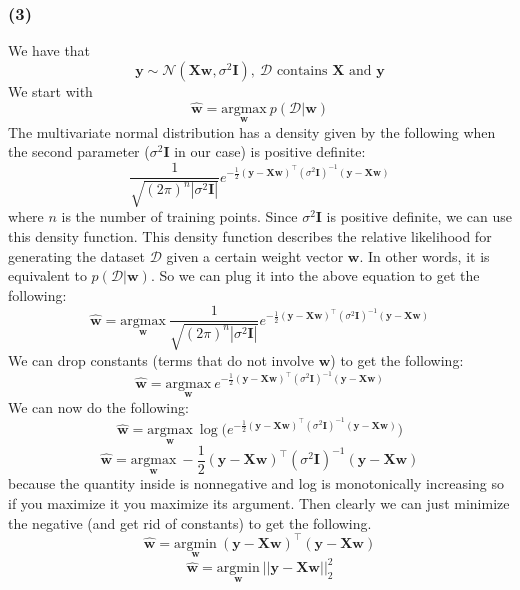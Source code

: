 \documentclass{article}
\newcommand*{\wb}{\ensuremath{\mathbf{w}}}
\newcommand*{\yb}{\ensuremath{\mathbf{y}}}
\newcommand*{\Xb}{\ensuremath{\mathbf{X}}}
\newcommand*{\Ib}{\ensuremath{\mathbf{I}}}
\begin{document}
\subsubsection*{(3)}
We have that
\[ \yb \sim \mathcal{N}(\Xb \wb, \sigma^2 \Ib), \> \mathcal{D} \text{ contains }
    \Xb \text{ and } \yb \]
We start with
\[ \hat{\wb} = \underset{\wb}{\text{argmax}} \> p(\mathcal{D}|\wb) \]
The multivariate normal distribution has a density given by
the following when the second parameter ($\sigma^2 \Ib$ in our case) is positive
definite:
\[ \frac{1}{\sqrt{(2 \pi)^n |\sigma^2 \Ib|}}
    e^{-\frac{1}{2}(\yb - \Xb \wb)^{\intercal} (\sigma^2 \Ib)^{-1}(\yb - \Xb \wb)} \]
where $n$ is the number of training points.
Since $\sigma^2 \Ib$ is positive definite, we can use this density function.
This density function describes the relative likelihood for generating the dataset
$\mathcal{D}$ given a certain weight vector $\wb$. In other words, it is equivalent
to $p(\mathcal{D}|\wb)$. So we can plug it into the above equation to get the
following:
\[ \hat{\wb} = \underset{\wb}{\text{argmax}} \>
    \frac{1}{\sqrt{(2 \pi)^n |\sigma^2 \Ib|}}
    e^{-\frac{1}{2}(\yb - \Xb \wb)^{\intercal} (\sigma^2 \Ib)^{-1}(\yb - \Xb \wb)} \]
We can drop constants (terms that do not involve $\wb$) to get the following:
\[ \hat{\wb} = \underset{\wb}{\text{argmax}} \>
    e^{-\frac{1}{2}(\yb - \Xb \wb)^{\intercal} (\sigma^2 \Ib)^{-1}(\yb - \Xb \wb)} \]
We can now do the following:
\[ \hat{\wb} = \underset{\wb}{\text{argmax}} \>
    \log \Big( e^{-\frac{1}{2}(\yb - \Xb \wb)^{\intercal}
    (\sigma^2 \Ib)^{-1}(\yb - \Xb \wb)} \Big) \]
\[ \hat{\wb} = \underset{\wb}{\text{argmax}} \>
    -\frac{1}{2}(\yb - \Xb \wb)^{\intercal} (\sigma^2 \Ib)^{-1}(\yb - \Xb \wb) \]
because the quantity inside is nonnegative and log is monotonically
increasing so if you maximize it you maximize its argument. Then clearly we can just
minimize the negative (and get rid of constants) to get the following.
\[ \hat{\wb} = \underset{\wb}{\text{argmin}} \>
    (\yb - \Xb \wb)^{\intercal}(\yb - \Xb \wb) \]
\[ \hat{\wb} = \underset{\wb}{\text{argmin}} \> ||\yb - \Xb \wb||^2_2 \]
\end{document}
